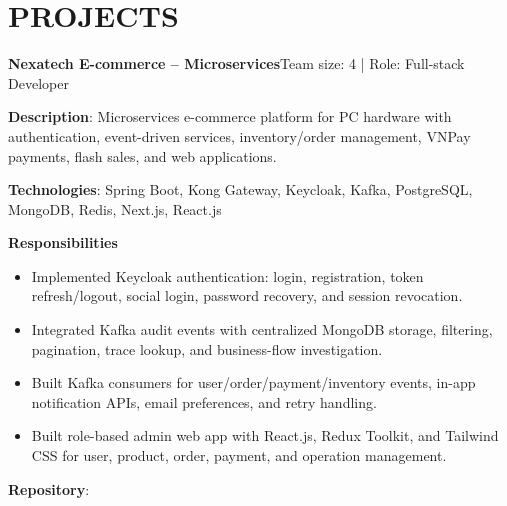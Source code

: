 \section{PROJECTS}
\resumeSubHeadingListStart

  \resumeProjectHeading
    {\textbf{Nexatech E-commerce -- Microservices}}{Team size: 4 | Role: Full-stack Developer}
    \resumeItemListStart
      \item \textbf{Description}: Microservices e-commerce platform for PC hardware with authentication, event-driven services, inventory/order management, VNPay payments, flash sales, and web applications.
      \item \textbf{Technologies}: Spring Boot, Kong Gateway, Keycloak, Kafka, PostgreSQL, MongoDB, Redis, Next.js, React.js
      \item \textbf{Responsibilities}
        \begin{itemize}
          \item Implemented Keycloak authentication: login, registration, token refresh/logout, social login, password recovery, and session revocation.
          \item Integrated Kafka audit events with centralized MongoDB storage, filtering, pagination, trace lookup, and business-flow investigation.
          \item Built Kafka consumers for user/order/payment/inventory events, in-app notification APIs, email preferences, and retry handling.
          \item Built role-based admin web app with React.js, Redux Toolkit, and Tailwind CSS for user, product, order, payment, and operation management.
        \end{itemize}
      \item \textbf{Repository}: \href{https://github.com/nvminh162-archive/nexatech-ecommerce}{}
    \resumeItemListEnd


